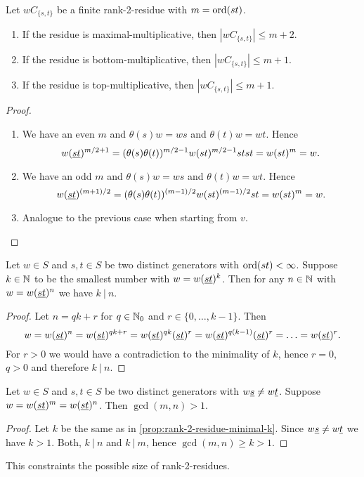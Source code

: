 \begin{coro}
	Let $wC_{\{s,t\}}$ be a finite rank-2-residue with $m = \operatorname{ord}(st)$.
	\begin{enumerate}
		\item If the residue is maximal-multiplicative, then $|wC_{\{s,t\}}| \leq m+2$.
		\item If the residue is bottom-multiplicative, then $|wC_{\{s,t\}}| \leq m+1$.
		\item If the residue is top-multiplicative, then $|wC_{\{s,t\}}| \leq m+1$. 
	\end{enumerate}

	\begin{proof}
		\begin{enumerate}
			\item We have an even $m$ and $\theta(s)w = ws$ and $\theta(t)w = wt$. Hence
			$$ w (\underline{s} \underline{t})^{m/2+1} = (\theta(s)\theta(t))^{m/2-1} w (st)^{m/2-1} stst = w(st)^m = w. $$
			\item We have an odd $m$ and $\theta(s)w = ws$ and $\theta(t)w = wt$. Hence
			$$ w (\underline{s} \underline{t})^{(m+1)/2} = (\theta(s)\theta(t))^{(m-1)/2} w (st)^{(m-1)/2} st = w(st)^m = w. $$
			\item Analogue to the previous case when starting from $v$. \qedhere
		\end{enumerate}
	\end{proof}
\end{coro}

\begin{prop}
	Let $w \in S$ and $s,t \in S$ be two distinct generators with $\operatorname{ord}(st) < \infty$. Suppose $k \in \mathbb{N}$ to be the smallest number with $w = w(\underline{s} \underline{t})^k$. Then for any $n \in \mathbb{N}$ with $w = w(\underline{s} \underline{t})^n$ we have $k \ | \ n$.

	\begin{proof}
		Let $n = qk + r$ for $q \in \mathbb{N}_0$ and $r \in \{0,\ldots,k-1\}$. Then
		$$ w = w(\underline{s} \underline{t})^n = w(\underline{s} \underline{t})^{qk+r} = w(\underline{s} \underline{t})^{qk} (\underline{s} \underline{t})^r = w (\underline{s} \underline{t})^{q(k-1)} (\underline{s} \underline{t})^r = \ldots = w(\underline{s} \underline{t})^r. $$
		For $r > 0$ we would have a contradiction to the minimality of $k$, hence $r = 0$, $q > 0$ and therefore $k \ | \ n$.
	\end{proof}
\end{prop}

\begin{coro}
	Let $w \in S$ and $s,t \in S$ be two distinct generators with $w \underline{s} \neq w \underline{t}$. Suppose $w = w(\underline{s} \underline{t})^m = w(\underline{s} \underline{t})^n$. Then $\gcd(m,n) > 1$.

	\begin{proof}
		Let $k$ be the same as in \ref{prop:rank-2-residue-minimal-k}. Since $w \underline{s} \neq w \underline{t}$ we have $k > 1$. Both, $k \ | \ n$ and $k \ | \ m$, hence $\gcd(m,n) \geq k > 1$.
	\end{proof}
\end{coro}

This constraints the possible size of rank-2-residues.